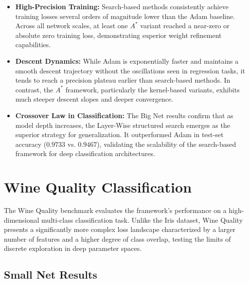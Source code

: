 \begin{itemize}
    \item \textbf{High-Precision Training:} Search-based methods consistently achieve training losses several orders of magnitude lower than the Adam baseline. Across all network scales, at least one $A^*$ variant reached a near-zero or absolute zero training loss, demonstrating superior weight refinement capabilities.
    \item \textbf{Descent Dynamics:} While Adam is exponentially faster and maintains a smooth descent trajectory without the oscillations seen in regression tasks, it tends to reach a precision plateau earlier than search-based methods. In contrast, the $A^*$ framework, particularly the kernel-based variants, exhibits much steeper descent slopes and deeper convergence.
    \item \textbf{Crossover Law in Classification:} The Big Net results confirm that as model depth increases, the Layer-Wise structured search emerges as the superior strategy for generalization. It outperformed Adam in test-set accuracy ($0.9733$ vs. $0.9467$), validating the scalability of the search-based framework for deep classification architectures.
\end{itemize}




\newpage

\section{Wine Quality Classification}
\label{sec:results_wine}

The Wine Quality benchmark evaluates the framework's performance on a high-dimensional multi-class classification task. Unlike the Iris dataset, Wine Quality presents a significantly more complex loss landscape characterized by a larger number of features and a higher degree of class overlap, testing the limits of discrete exploration in deep parameter spaces.

\subsection{Small Net Results}

